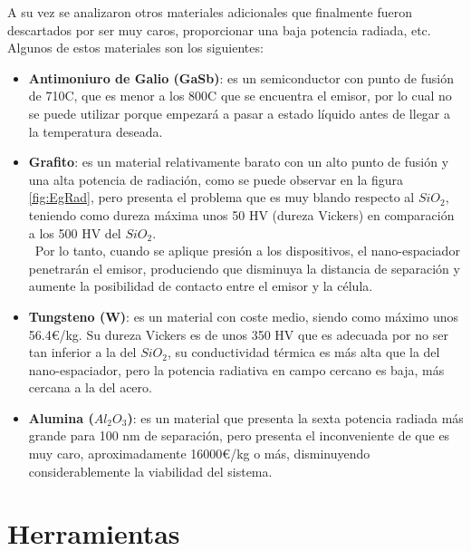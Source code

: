A su vez se analizaron otros materiales adicionales que finalmente fueron descartados por ser muy caros, proporcionar una baja potencia radiada, etc. %
Algunos de estos materiales son los siguientes:

\begin{itemize}
	\item \textbf{Antimoniuro de Galio (GaSb)}: es un semiconductor con punto de fusión de 710\textdegree C, que es menor a los 800\textdegree C que se encuentra el emisor, por lo cual no se puede utilizar porque empezará a pasar a estado líquido antes de llegar a la temperatura deseada.
	\item \textbf{Grafito}: es un material relativamente barato con un alto punto de fusión y una alta potencia de radiación, como se puede observar en la figura \ref{fig:EgRad}, pero presenta el problema que es muy blando respecto al $SiO_2$, teniendo como dureza máxima unos 50 HV (dureza Vickers) en comparación a los 500 HV del $SiO_2$.\\\ Por lo tanto, cuando se aplique presión a los dispositivos, el nano-espaciador penetrarán el emisor, produciendo que disminuya la distancia de separación y aumente la posibilidad de contacto entre el emisor y la célula.
	\item \textbf{Tungsteno (W)}: es un material con coste medio, siendo como máximo unos 56.4€/kg. Su dureza Vickers es de unos 350 HV que es adecuada por no ser tan inferior a la del $SiO_2$, su conductividad térmica es más alta que la del nano-espaciador, pero la potencia radiativa en campo cercano es baja, más cercana a la del acero.
	\item \textbf{Alumina ($Al_2O_3$)}: es un material que presenta la sexta potencia radiada más grande para 100 nm de separación, pero presenta el inconveniente de que es muy caro, aproximadamente 16000€/kg o más, disminuyendo considerablemente la viabilidad del sistema.
\end{itemize}
\section{Herramientas}

